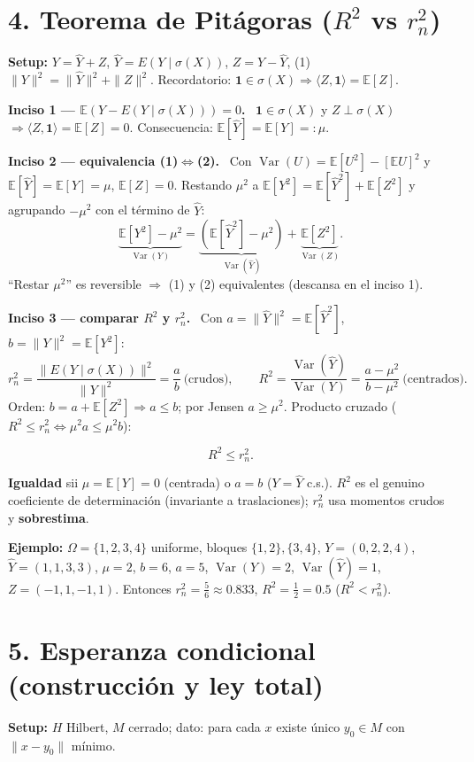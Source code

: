 \documentclass[11pt]{article}
\newcommand{\E}{\mathbb{E}}
\newcommand{\Var}{\operatorname{Var}}
\newcommand{\sg}{\sigma}
\newcommand{\inc}[1]{\smallskip\noindent\textbf{\color{blue!30!black}#1}\ }
\begin{document}
\section*{4. Teorema de Pitágoras ($R^2$ vs $r_n^2$)}
\textbf{Setup:} $Y=\hat Y+Z$, $\hat Y=E(Y\mid\sg(X))$, $Z=Y-\hat Y$, (1) $\|Y\|^2=\|\hat Y\|^2+\|Z\|^2$.
Recordatorio: $\mathbf 1\in\sg(X)\Rightarrow\langle Z,\mathbf 1\rangle=\E[Z]$.

\inc{Inciso 1 — $\E(Y-E(Y\mid\sg(X)))=0$.} $\mathbf 1\in\sg(X)$ y $Z\perp\sg(X)$
$\Rightarrow\langle Z,\mathbf 1\rangle=\E[Z]=0$. Consecuencia: $\E[\hat Y]=\E[Y]=:\mu$.

\inc{Inciso 2 — equivalencia (1)$\Leftrightarrow$(2).} Con $\Var(U)=\E[U^2]-[\E U]^2$ y $\E[\hat Y]=\E[Y]=\mu$,
$\E[Z]=0$. Restando $\mu^2$ a $\E[Y^2]=\E[\hat Y^2]+\E[Z^2]$ y agrupando $-\mu^2$ con el término de $\hat Y$:
\[ \underbrace{\E[Y^2]-\mu^2}_{\Var(Y)}=\underbrace{(\E[\hat Y^2]-\mu^2)}_{\Var(\hat Y)}+\underbrace{\E[Z^2]}_{\Var(Z)}. \]
``Restar $\mu^2$'' es reversible $\Rightarrow$ (1) y (2) equivalentes (descansa en el inciso 1).

\inc{Inciso 3 — comparar $R^2$ y $r_n^2$.} Con $a=\|\hat Y\|^2=\E[\hat Y^2]$, $b=\|Y\|^2=\E[Y^2]$:
\[ r_n^2=\frac{\|E(Y\mid\sg(X))\|^2}{\|Y\|^2}=\frac{a}{b}\ \text{(crudos)},\qquad
R^2=\frac{\Var(\hat Y)}{\Var(Y)}=\frac{a-\mu^2}{b-\mu^2}\ \text{(centrados)}. \]
Orden: $b=a+\E[Z^2]\Rightarrow a\le b$; por Jensen $a\ge\mu^2$. Producto cruzado ($R^2\le r_n^2\iff\mu^2 a\le\mu^2 b$):
\begin{keybox}\[ R^2\le r_n^2. \]\end{keybox}
\textbf{Igualdad} sii $\mu=\E[Y]=0$ (centrada) o $a=b$ ($Y=\hat Y$ c.s.). $R^2$ es el genuino coeficiente
de determinación (invariante a traslaciones); $r_n^2$ usa momentos crudos y \textbf{sobrestima}.

\textbf{Ejemplo:} $\Omega=\{1,2,3,4\}$ uniforme, bloques $\{1,2\},\{3,4\}$, $Y=(0,2,2,4)$, $\hat Y=(1,1,3,3)$,
$\mu=2$, $b=6$, $a=5$, $\Var(Y)=2$, $\Var(\hat Y)=1$, $Z=(-1,1,-1,1)$. Entonces
$r_n^2=\tfrac56\approx0.833$, $R^2=\tfrac12=0.5$ ($R^2<r_n^2$).

\section*{5. Esperanza condicional (construcción y ley total)}
\textbf{Setup:} $H$ Hilbert, $M$ cerrado; dato: para cada $x$ existe único $y_0\in M$ con $\|x-y_0\|$ mínimo.
\end{document}
